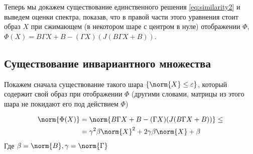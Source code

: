 Теперь мы докажем существование единственного решения \eqref{eq:similarity2}
и выведем оценки спектра,
показав, что в правой части этого уравнения стоит образ \( X \)
при сжимающем (в некотором шаре с центром в нуле) отображении \( \Phi \),
\( \Phi(X) = B \Gamma X + B - (\Gamma X) (J(B\Gamma X + B)) \).

\subsection{Существование инвариантного множества}
Покажем сначала существование такого шара \( \{ \norm{X} \leq \varepsilon \} \),
который содержит свой образ при отображении \( \Phi \)
(другими словами, матрицы из этого шара
 не покидают его под действием \( \Phi \))

\begin{align*}
    \norm{\Phi(X)} &= \norm{B \Gamma X + B - (\Gamma X) (J(B\Gamma X + B))} \leq \\
    &= \gamma^2\beta\norm{X}^2 + 2\gamma\beta\norm{X} + \beta
\end{align*}
Где \( \beta=\norm{B}, \gamma=\norm{\Gamma} \)

